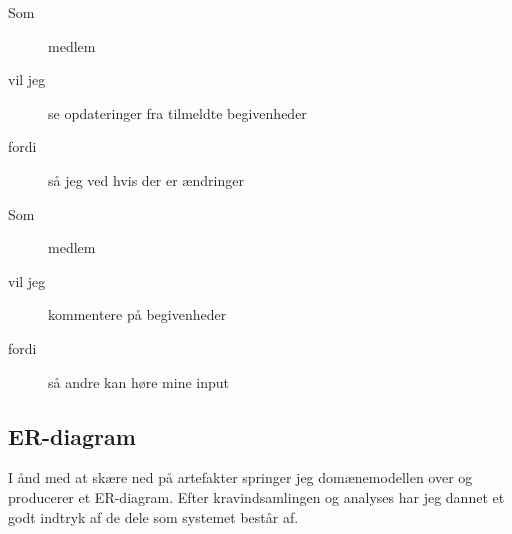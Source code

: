 \documentclass[../main]{subfiles}
\begin{document}
        \begin{description}
            \item[Som] medlem
            \item[vil jeg] se opdateringer fra tilmeldte begivenheder
            \item[fordi] så jeg ved hvis der er ændringer
        \end{description}

        \begin{description}
            \item[Som] medlem
            \item[vil jeg] kommentere på begivenheder
            \item[fordi] så andre kan høre mine input
        \end{description}


    \subsection{ER-diagram}
        I ånd med at skære ned på artefakter springer jeg domænemodellen over og producerer et ER-diagram. Efter kravindsamlingen og analyses har jeg dannet et godt indtryk af de dele som systemet består af.
\end{document}
